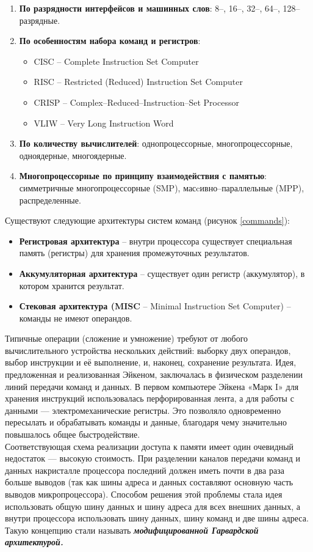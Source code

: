 \begin{enumerate}
  \item \textbf{По разрядности интерфейсов и машинных слов}: 8--, 16--, 32--, 64--, 128--разрядные.
  \item \textbf{По особенностям набора команд и регистров}:
  \begin{itemize}
    \item CISC – Complete Instruction Set Computer
    \item RISC – Restricted (Reduced) Instruction Set Computer
    \item CRISP – Complex--Reduced--Instruction--Set Processor
    \item VLIW – Very Long Instruction Word
  \end{itemize}
  \item \textbf{По количеству вычислителей}: однопроцессорные, многопроцессорные, одноядерные, многоядерные.
  \item \textbf{Многопроцессорные по принципу взаимодействия с памятью}: симметричные многопроцессорные (SMP), масcивно--параллельные (MPP), распределенные.
\end{enumerate}
Существуют следующие архитектуры систем команд (рисунок \ref{commands}):
\begin{itemize}
  \item \textbf{Регистровая архитектура} -- внутри процессора существует специальная память (регистры) для хранения промежуточных результатов.
  \item \textbf{Аккумуляторная архитектура} -- существует один регистр (аккумулятор), в котором хранится результат.
  \item \textbf{Стековая архитектура (MISC } -- Minimal Instruction Set Computer) -- команды не имеют операндов.
\end{itemize}
Типичные операции (сложение и умножение) требуют от любого вычислительного устройства нескольких действий: выборку двух операндов, выбор инструкции и её выполнение, и, наконец, сохранение результата. Идея, предложенная и  реализованная Эйкеном, заключалась в физическом разделении линий передачи команд и данных. В первом компьютере Эйкена «Марк I» для хранения инструкций использовалась перфорированная лента, а для работы с данными — электромеханические регистры. Это позволяло одновременно пересылать и обрабатывать команды и данные, благодаря чему значительно повышалось общее быстродействие.
\\Соответствующая схема реализации доступа к памяти имеет один очевидный недостаток — высокую стоимость. При разделении каналов передачи команд и данных накристалле процессора последний должен иметь почти в два раза больше выводов (так как шины адреса и данных составляют основную часть выводов микропроцессора). Способом решения этой проблемы стала идея использовать общую шину данных и шину адреса для всех внешних данных, а внутри процессора использовать шину данных, шину команд и две шины адреса. Такую концепцию стали называть \textbf { \emph{модифицированной Гарвардской архитектурой.}}
